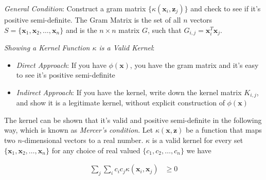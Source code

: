 \documentclass{article}
\begin{document}
{\em General Condition}: Construct a gram matrix $\{\kappa(\mathbf{x}_{i},\mathbf{z}_{j})\}$ and check to see if it's positive semi-definite. The Gram Matrix is the set of all $n$ vectors $S=\{\mathbf{x}_{1},\mathbf{x}_{2},\ldots,\mathbf{x}_{n}\}$ and is the $n\times n$ matrix $G$, such that $G_{i,j} = \mathbf{x}_{i}^{T}\mathbf{x}_{j}$. 

{\em Showing a Kernel Function $\kappa$ is a Valid Kernel}:
\begin{itemize}
\item {\em Direct Approach}: If you have $\phi(\mathbf{x})$, you have the gram matrix and it's easy to see it's positive semi-definite
\item {\em Indirect Approach}: If you have the kernel, write down the kernel matrix $K_{i,j}$, and show it is a legitimate kernel, without explicit construction of $\phi(\mathbf{x})$
\end{itemize}

The kernel can be shown that it's valid and positive semi-definite in the following way, which is known as {\em Mercer's condition}. Let $\kappa(\mathbf{x},\mathbf{z})$ be a function that maps two $n$-dimensional vectors to a real number. $\kappa$ is a valid kernel for every set $\{\mathbf{x}_{1},\mathbf{x}_{2},\ldots,\mathbf{x}_{n}\}$ for any choice of real valued $\{c_{1},c_{2},\ldots,c_{n}\}$ we have

\begin{align}
\sum_{j}\sum_{i}c_{i}c_{j}\kappa(\mathbf{x}_{i},\mathbf{x}_{j})&\geq 0
\end{align}
\end{document}
